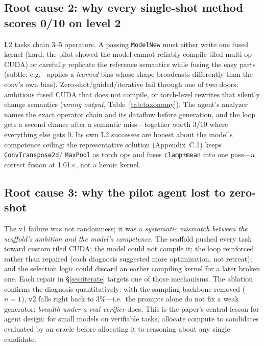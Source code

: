 \documentclass[conference]{IEEEtran}
\begin{document}
\subsection{Root cause 2: why every single-shot method scores 0/10 on level 2}

L2 tasks chain 3--5 operators. A passing \texttt{ModelNew} must either write one
fused kernel (hard: the pilot showed the model cannot reliably compile tiled
multi-op CUDA) or carefully replicate the reference semantics while fusing the easy
parts (subtle: e.g.\  applies a
\emph{learned} bias whose shape broadcasts differently than the conv's own bias).
Zero-shot/guided/iterative fail through one of two doors: ambitious fused CUDA that
does not compile, or torch-level rewrites that silently change semantics
(\emph{wrong output}, Table~\ref{tab:taxonomy}). The agent's analyzer names the
exact operator chain and its dataflow before generation, and the loop gets a second
chance after a semantic miss---together worth 3/10 where everything else gets 0.
Its own L2 successes are honest about the model's competence ceiling: the
representative solution (Appendix~C.1) keeps \texttt{ConvTranspose2d}/\allowbreak
\texttt{MaxPool} as torch ops and fuses \texttt{clamp+mean} into one pass---a
correct fusion at 1.01$\times$, not a heroic kernel.

\subsection{Root cause 3: why the pilot agent lost to zero-shot}

The v1 failure was not randomness; it was a \emph{systematic mismatch between the
scaffold's ambition and the model's competence}. The scaffold pushed every task
toward custom tiled CUDA; the model could not compile it; the loop reinforced
rather than repaired (each diagnosis suggested more optimization, not retreat); and
the selection logic could discard an earlier compiling kernel for a later broken
one. Each repair in \S\ref{sec:iterate} targets one of those mechanisms. The
ablation confirms the diagnosis quantitatively: with the sampling backbone removed
($n{=}1$), v2 falls right back to 3\%---i.e.\ the prompts alone do not fix a weak
generator; \emph{breadth under a real verifier} does. This is the paper's central
lesson for agent design: for small models on verifiable tasks, allocate compute to
candidates evaluated by an oracle before allocating it to reasoning about any
single candidate.
\end{document}
